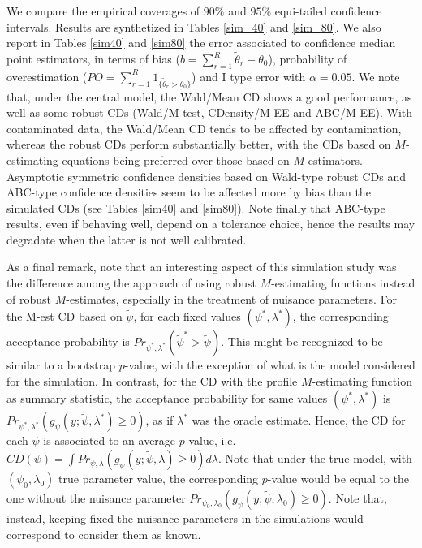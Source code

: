\documentclass[preprint,12pt,authoryear]{elsarticle}
\newcommand{\bb}{\textcolor{blue}}
\begin{document}
We compare the empirical coverages of $90\%$ and $95\%$ equi-tailed  confidence intervals.  Results are synthetized in Tables \ref{sim_40} and \ref{sim_80}. We also report in Tables  \ref{sim40} and \ref{sim80} the error associated to confidence median point estimators, in terms of bias ($b=\sum_{r=1}^{R}\tilde\theta_r- \theta_0$), probability of overestimation
($PO=\sum_{r=1}^{R}1_{\{\tilde\theta_r> \theta_0\}}$) and I type error with $\alpha=0.05$.
We note that, under the central model, the Wald/Mean CD shows a good performance, as well as some robust CDs (Wald/M-test, CDensity/M-EE and ABC/M-EE). With contaminated data, the Wald/Mean CD tends to be affected by contamination, whereas the robust CDs perform substantially better, with the CDs based on $M$-estimating equations being preferred over those based on $M$-estimators. Asymptotic symmetric confidence densities based on Wald-type robust CDs and ABC-type confidence densities seem to be affected more by bias than the simulated CDs (see Tables \ref{sim40} and \ref{sim80}). Note finally that ABC-type results, even if behaving well, depend on a tolerance choice, hence the results may degradate when the latter is not well calibrated.




As a final remark, note that an interesting aspect of this simulation study was the difference among the approach of using robust $M$-estimating functions instead of robust $M$-estimates, especially in the treatment of nuisance parameters.
 For the M-est CD based on $\tilde\psi$, for each fixed values  $(\psi^*, \lambda^*)$,   the corresponding acceptance probability is  $Pr_{\psi^*, \lambda^*}\left(\tilde\psi^*> \tilde\psi\right) $.  This might be recognized to be similar to a bootstrap $p$-value, with the exception of what is the model considered for the simulation.
 In contrast, for the CD with the profile $M$-estimating function as summary statistic, the acceptance probability for same  values $(\psi^*,\lambda^*)$  is 
$Pr_{\psi^*, \lambda^*} \left(g_\psi(y; \tilde\psi, \lambda^*) \ge 0  \right)$,
as if  $\lambda^*$ was the oracle estimate. Hence, the CD for each $\psi$ is associated to  an average $p$-value, i.e.
$
CD(\psi) =\int Pr_{\psi,\lambda}(g_{\psi}(y; \tilde\psi, \lambda)\geq 0 ) d\lambda.
$
Note that under the true  model, with $(\psi_0, \lambda_0)$ true parameter value, the corresponding $p$-value would be equal to the one without the nuisance parameter
$ Pr_{\psi_0,\lambda_0}(g_\psi(y; \tilde\psi,\lambda_0)\geq 0).$
Note that, instead, keeping fixed the nuisance parameters in the simulations would correspond to consider them as known.
 
\end{document}
